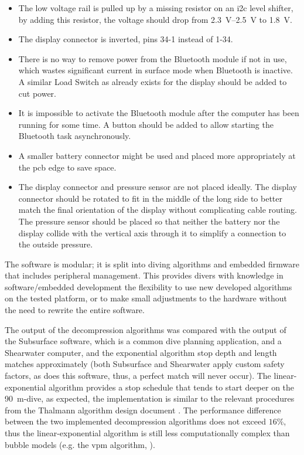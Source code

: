 \begin{itemize}
    \item The low voltage rail is pulled up by a missing resistor on an \gls{i2c} level shifter, by adding this resistor, the voltage should drop from \SI{2.3}{\volt}--\SI{2.5}{\volt} to \SI{1.8}{\volt}.
    \item The display connector is inverted, pins 34-1 instead of 1-34.
    \item There is no way to remove power from the Bluetooth module if not in use, which wastes significant current in surface mode when Bluetooth is inactive. 
    A similar Load Switch as already exists for the display should be added to cut power.
    \item It is impossible to activate the Bluetooth module after the computer has been running for some time. A button should be added to allow starting the Bluetooth task asynchronously.
    \item A smaller battery connector might be used and placed more appropriately at the \gls{pcb} edge to save space.
    \item The display connector and pressure sensor are not placed ideally. 
    The display connector should be rotated to fit in the middle of the long side to better match the final orientation of the display without complicating cable routing. 
    The pressure sensor should be placed so that neither the battery nor the display collide with the vertical axis through it to simplify a connection to the outside pressure.
\end{itemize}

The software is modular; it is split into diving algorithms and embedded firmware that includes peripheral management. 
This provides divers with knowledge in software/embedded development the flexibility to use new developed algorithms on the tested platform, or to make small adjustments to the hardware without the need to rewrite the entire software.

The output of the decompression algorithms was compared with the output of the Subsurface software, which is a common dive planning application, and a Shearwater computer, and the exponential algorithm stop depth and length matches approximately (both Subsurface and Shearwater apply custom safety factors, as does this software, thus, a perfect match will never occur). The linear-exponential algorithm provides a stop schedule that tends to start deeper on the \SI{90}{\meter}-dive, as expected, the implementation is similar to the relevant procedures from the Thalmann algorithm design document \cite{thalmann-tables-software-2010}. 
The performance difference between the two implemented decompression algorithms does not exceed $16\%$, thus the linear-exponential algorithm is still less computationally complex than bubble models (e.g. the \gls{vpm} algorithm, \cite{diff-lim-deco-2003}\cite{understanding-modern-dive-computers}).

